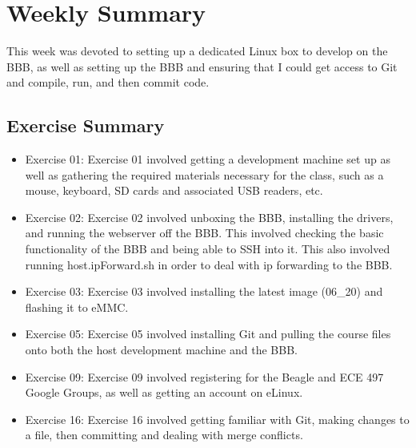 \documentclass[letterpaper,10pt]{texMemo}
\begin{document}
\maketitle

\section{Weekly Summary}

\noindent This week was devoted to setting up a dedicated Linux box to develop on the BBB, as well as setting up the BBB and ensuring that I could get access to Git and compile, run, and then commit code. 

\subsection{Exercise Summary}
\begin{itemize}
\item Exercise 01: Exercise 01 involved getting a development machine set up as well as gathering the required materials necessary for the class, such as a mouse, keyboard, SD cards and associated USB readers, etc.
\item Exercise 02: Exercise 02 involved unboxing the BBB, installing the drivers, and running the webserver off the BBB. This involved checking the basic functionality of the BBB and being able to SSH into it. This also involved running host.ipForward.sh in order to deal with ip forwarding to the BBB.
\item Exercise 03: Exercise 03 involved installing the latest image (06\_20) and flashing it to eMMC.
\item Exercise 05: Exercise 05 involved installing Git and pulling the course files onto both the host development machine and the BBB.
\item Exercise 09: Exercise 09 involved registering for the Beagle and ECE 497 Google Groups, as well as getting an account on eLinux.
\item Exercise 16: Exercise 16 involved getting familiar with Git, making changes to a file, then committing and dealing with merge conflicts.
\end{itemize}

\newpage
\end{document}
